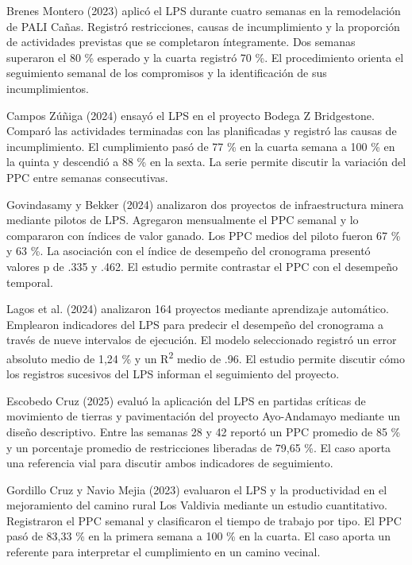 \documentclass[12pt,a4paper]{article}
\begin{document}
Brenes Montero (2023) aplicó el LPS durante cuatro semanas en la remodelación de PALI Cañas. Registró restricciones, causas de incumplimiento y la proporción de actividades previstas que se completaron íntegramente. Dos semanas superaron el 80 \% esperado y la cuarta registró 70 \%. El procedimiento orienta el seguimiento semanal de los compromisos y la identificación de sus incumplimientos.

Campos Zúñiga (2024) ensayó el LPS en el proyecto Bodega Z Bridgestone. Comparó las actividades terminadas con las planificadas y registró las causas de incumplimiento. El cumplimiento pasó de 77 \% en la cuarta semana a 100 \% en la quinta y descendió a 88 \% en la sexta. La serie permite discutir la variación del PPC entre semanas consecutivas.

Govindasamy y Bekker (2024) analizaron dos proyectos de infraestructura minera mediante pilotos de LPS. Agregaron mensualmente el PPC semanal y lo compararon con índices de valor ganado. Los PPC medios del piloto fueron 67 \% y 63 \%. La asociación con el índice de desempeño del cronograma presentó valores p de .335 y .462. El estudio permite contrastar el PPC con el desempeño temporal.

Lagos et al. (2024) analizaron 164 proyectos mediante aprendizaje automático. Emplearon indicadores del LPS para predecir el desempeño del cronograma a través de nueve intervalos de ejecución. El modelo seleccionado registró un error absoluto medio de 1,24 \% y un R\textsuperscript{2} medio de .96. El estudio permite discutir cómo los registros sucesivos del LPS informan el seguimiento del proyecto.

Escobedo Cruz (2025) evaluó la aplicación del LPS en partidas críticas de movimiento de tierras y pavimentación del proyecto Ayo-Andamayo mediante un diseño descriptivo. Entre las semanas 28 y 42 reportó un PPC promedio de 85 \% y un porcentaje promedio de restricciones liberadas de 79,65 \%. El caso aporta una referencia vial para discutir ambos indicadores de seguimiento.

Gordillo Cruz y Navio Mejia (2023) evaluaron el LPS y la productividad en el mejoramiento del camino rural Los Valdivia mediante un estudio cuantitativo. Registraron el PPC semanal y clasificaron el tiempo de trabajo por tipo. El PPC pasó de 83,33 \% en la primera semana a 100 \% en la cuarta. El caso aporta un referente para interpretar el cumplimiento en un camino vecinal.
\end{document}
